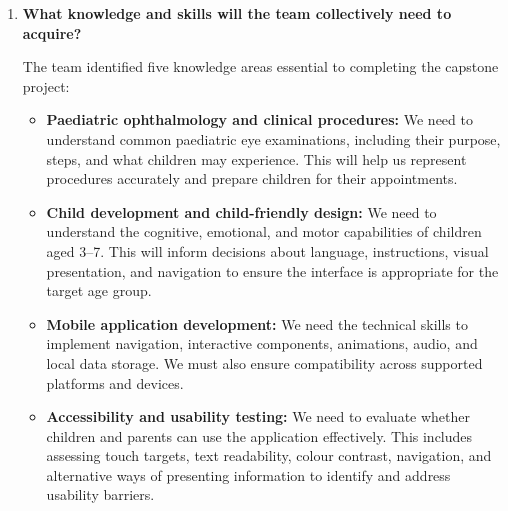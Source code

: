 \documentclass[12pt]{article}
\begin{document}
\begin{enumerate}
    SFWRENG 3A04, which focused on large system design, was also useful
    because it introduced concepts and activities similar to those involved
    in a capstone project. Designing a larger software system helped us
    understand the importance of defining scope, identifying system
    constraints, and considering interactions between system components.

    Additionally, SFWRENG 4HC3 was helpful because it involved interviewing
    stakeholders and eliciting requirements. These skills helped us identify
    important questions to ask our stakeholders and distinguish their needs
    from our own assumptions about the application.

    \item \textbf{What knowledge and skills will the team collectively
    need to acquire?}

    The team identified five knowledge areas essential to completing
    the capstone project:

    \begin{itemize}
        \item \textbf{Paediatric ophthalmology and clinical procedures:}
        We need to understand common paediatric eye examinations,
        including their purpose, steps, and what children may experience.
        This will help us represent procedures accurately and prepare
        children for their appointments.

        \item \textbf{Child development and child-friendly design:}
        We need to understand the cognitive, emotional, and motor
        capabilities of children aged 3--7. This will inform decisions
        about language, instructions, visual presentation, and navigation
        to ensure the interface is appropriate for the target age group.

        \item \textbf{Mobile application development:}
        We need the technical skills to implement navigation,
        interactive components, animations, audio, and local data
        storage. We must also ensure compatibility across supported
        platforms and devices.

        \item \textbf{Accessibility and usability testing:}
        We need to evaluate whether children and parents can use the
        application effectively. This includes assessing touch targets,
        text readability, colour contrast, navigation, and alternative
        ways of presenting information to identify and address usability
        barriers.


\end{itemize}
\end{enumerate}
\end{document}
